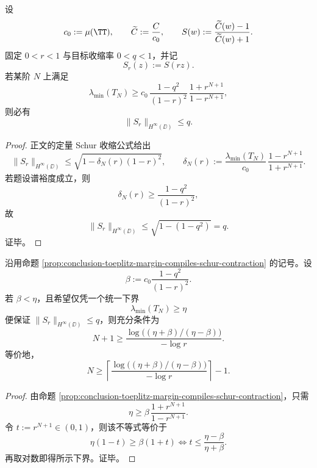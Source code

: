 \begin{proposition}\label{prop:conclusion-toeplitz-margin-compiles-schur-contraction}
设
\[
c_0:=\mu(\TT),
\qquad
\widetilde C:=\frac{C}{c_0},
\qquad
S(w):=\frac{\widetilde C(w)-1}{\widetilde C(w)+1}.
\]
固定 \(0<r<1\) 与目标收缩率 \(0<q<1\)，并记
\[
S_r(z):=S(rz).
\]
若某阶 \(N\) 上满足
\[
\lambda_{\min}(T_N)\ge
c_0\,\frac{1-q^2}{(1-r)^2}\,\frac{1+r^{N+1}}{1-r^{N+1}},
\]
则必有
\[
\|S_r\|_{H^\infty(\DD)}\le q.
\]
\end{proposition}
\begin{proof}
正文的定量 Schur 收缩公式给出
\[
\|S_r\|_{H^\infty(\DD)}
\le
\sqrt{1-\delta_N(r)(1-r)^2},
\qquad
\delta_N(r):=
\frac{\lambda_{\min}(T_N)}{c_0}\,\frac{1-r^{N+1}}{1+r^{N+1}}.
\]
若题设谱裕度成立，则
\[
\delta_N(r)\ge \frac{1-q^2}{(1-r)^2},
\]
故
\[
\|S_r\|_{H^\infty(\DD)}
\le
\sqrt{1-(1-q^2)}
=q.
\]
证毕。
\end{proof}

\begin{corollary}[固定可见半径下的最小阶数显式下界]\label{cor:conclusion-toeplitz-order-compilation-bound}
沿用命题 \ref{prop:conclusion-toeplitz-margin-compiles-schur-contraction} 的记号。设
\[
\beta:=c_0\frac{1-q^2}{(1-r)^2}.
\]
若 \(\beta<\eta\)，且希望仅凭一个统一下界
\[
\lambda_{\min}(T_N)\ge \eta
\]
便保证 \(\|S_r\|_{H^\infty(\DD)}\le q\)，则充分条件为
\[
N+1\ge
\frac{\log\!\bigl((\eta+\beta)/(\eta-\beta)\bigr)}{-\log r}.
\]
等价地，
\[
N\ge
\left\lceil
\frac{\log\!\bigl((\eta+\beta)/(\eta-\beta)\bigr)}{-\log r}
\right\rceil-1.
\]
\end{corollary}
\begin{proof}
由命题 \ref{prop:conclusion-toeplitz-margin-compiles-schur-contraction}，只需
\[
\eta\ge \beta\,\frac{1+r^{N+1}}{1-r^{N+1}}.
\]
令 \(t:=r^{N+1}\in(0,1)\)，则该不等式等价于
\[
\eta(1-t)\ge \beta(1+t)
\iff
t\le \frac{\eta-\beta}{\eta+\beta}.
\]
再取对数即得所示下界。证毕。
\end{proof}

